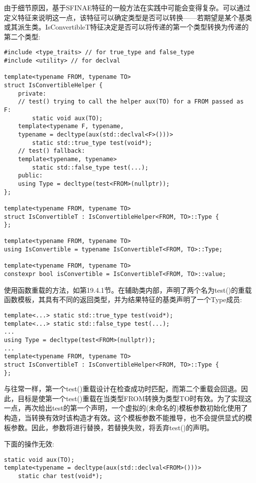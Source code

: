 由于细节原因，基于SFINAE特征的一般方法在实践中可能会变得复杂。可以通过定义特征来说明这一点，该特征可以确定类型是否可以转换——若期望是某个基类或其派生类。IsConvertibleT特征决定是否可以将传递的第一个类型转换为传递的第二个类型:

\begin{lstlisting}[style=styleCXX]
#include <type_traits> // for true_type and false_type
#include <utility> // for declval

template<typename FROM, typename TO>
struct IsConvertibleHelper {
	private:
	// test() trying to call the helper aux(TO) for a FROM passed as F:
		static void aux(TO);
	template<typename F, typename,
	typename = decltype(aux(std::declval<F>()))>
		static std::true_type test(void*);
	// test() fallback:
	template<typename, typename>
		static std::false_type test(...);
	public:
	using Type = decltype(test<FROM>(nullptr));
};

template<typename FROM, typename TO>
struct IsConvertibleT : IsConvertibleHelper<FROM, TO>::Type {
};

template<typename FROM, typename TO>
using IsConvertible = typename IsConvertibleT<FROM, TO>::Type;

template<typename FROM, typename TO>
constexpr bool isConvertible = IsConvertibleT<FROM, TO>::value;
\end{lstlisting}

使用函数重载的方法，如第19.4.1节。在辅助类内部，声明了两个名为test()的重载函数模板，其具有不同的返回类型，并为结果特征的基类声明了一个Type成员:

\begin{lstlisting}[style=styleCXX]
template<...> static std::true_type test(void*);
template<...> static std::false_type test(...);
...
using Type = decltype(test<FROM>(nullptr));
...
template<typename FROM, typename TO>
struct IsConvertibleT : IsConvertibleHelper<FROM, TO>::Type {
};
\end{lstlisting}

与往常一样，第一个test()重载设计在检查成功时匹配，而第二个重载会回退。因此，目标是使第一个test()重载在当类型FROM转换为类型TO时有效。为了实现这一点，再次给出test的第一个声明，一个虚拟的(未命名的)模板参数初始化使用了构造，当转换有效时该构造才有效。这个模板参数不能推导，也不会提供显式的模板参数。因此，参数将进行替换，若替换失败，将丢弃test()的声明。

下面的操作无效:

\begin{lstlisting}[style=styleCXX]
static void aux(TO);
template<typename = decltype(aux(std::declval<FROM>()))>
	static char test(void*);
\end{lstlisting}

